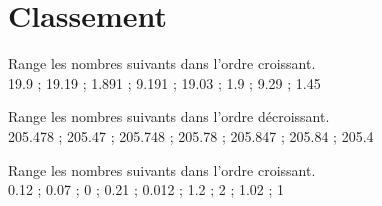 \section{Classement}

\begin{questions}
	\question Range les nombres suivants dans l'ordre croissant. \\
	\num{19.9} ; \num{19.19} ; \num{1.891} ; \num{9.191} ; \num{19.03} ; \num{1.9} ; \num{9.29} ; \num{1.45}
	
	\question Range les nombres suivants dans l'ordre décroissant. \\
	\num{205.478} ; \num{205.47} ; \num{205.748} ; \num{205.78} ; \num{205.847} ; \num{205.84} ; \num{205.4}
	
	\question Range les nombres suivants dans l'ordre croissant. \\
	\num{0.12} ; \num{0.07} ; \num{0} ; \num{0.21} ; \num{0.012} ; \num{1.2} ; 2 ;  \num{1.02} ; \num{1}
\end{questions}